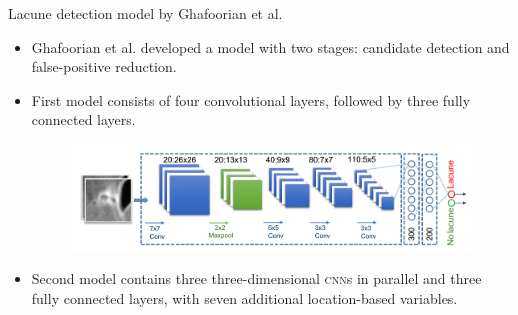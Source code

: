 \documentclass{beamer}
\begin{document}
\begin{frame}{Lacune detection model by Ghafoorian et al.}
\begin{itemize}
\item Ghafoorian et al. \cite{GhafoorianM.2017Dml3} developed a model with two stages: candidate detection and false-positive reduction.
\item First model consists of four convolutional layers, followed by three fully connected layers.
\begin{figure}
\centering
\includegraphics[width=\linewidth]{../Thesis_Docs/Images/5_ghafoorian_model1.png}
\end{figure}
\item Second model contains three three-dimensional \textsc{cnn}s in parallel and three fully connected layers, with seven additional location-based variables.
\end{itemize}

\end{frame}
\end{document}

